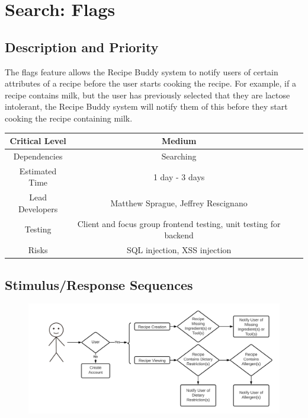 \documentclass{scrreprt}
\begin{document}
\section{Search: Flags}

\subsection{Description and Priority}

The flags feature allows the \gls{Recipe Buddy} system to notify users of certain attributes of a recipe before the user starts cooking the recipe. For example, if a recipe contains milk, but the user has previously selected that they are lactose intolerant, the \gls{Recipe Buddy} system will notify them of this before they start cooking the recipe containing milk.

\begin{center}
    \begin{tabular}{| c | c | c | c |}
        \hline
        Critical Level  & Medium                                                            \\
        \hline
        Dependencies    & Searching                                                         \\
        \hline
        Estimated Time  & 1 day - 3 days                                                    \\
        \hline
        Lead Developers & Matthew Sprague, Jeffrey Rescignano              \\
        \hline
        Testing         & Client and focus group \gls{frontend} testing,
                          \gls{unit testing} for \gls{backend}                              \\
        \hline
        Risks           & \gls{SQL injection}, \gls{XSS injection}                          \\
        \hline
    \end{tabular}
\end{center}

\subsection{Stimulus/Response Sequences}

\begin{figure}[H]\centering
    \includegraphics[width=\columnwidth]{FlowCharts/Search-Flags.png}
\end{figure}
\end{document}
